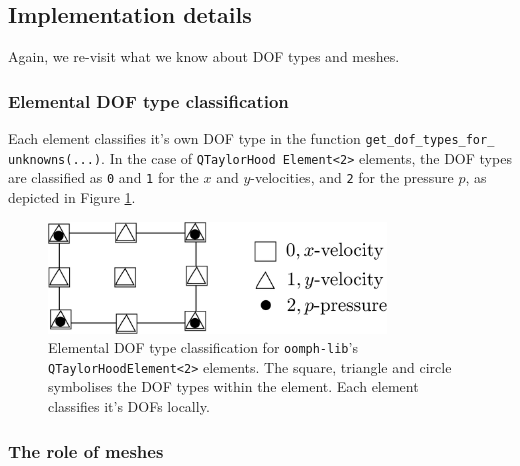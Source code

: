 \subsection{Implementation details\label{sec:lgr_implementation}}

Again, we re-visit what we know about DOF types and meshes.


\subsubsection{Elemental DOF type classification}

Each element classifies it's own DOF type in the function
\texttt{get\_\allowbreak dof\_\allowbreak types\_\allowbreak for\_\allowbreak
  unknowns(...)}. In the case of \texttt{Q\allowbreak TaylorHood\allowbreak
  Element<2>} elements, the DOF types are classified as \texttt{0} and
\texttt{1} for the $x$ and $y$-velocities, and \texttt{2} for the pressure $p$,
as depicted in Figure \ref{fig:2DTH_DOF_classification_val}.
\begin{figure}[H]
\centering
\includegraphics[width=0.8\textwidth]{./pic/taylorhood_dof_classification.pdf}
\caption{Elemental DOF type classification for \texttt{oomph-\allowbreak lib}'s
  \texttt{Q\allowbreak TaylorHood\allowbreak Element<2>} elements. The square,
  triangle and circle symbolises the DOF types within the element. Each element
  classifies it's DOFs locally.}
\label{fig:2DTH_DOF_classification_val}
\end{figure}

\subsubsection{The role of meshes}


